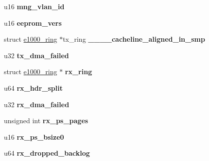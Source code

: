 \begin{DoxyCompactItemize}
\item 
\hypertarget{structe1000__adapter_ae96b179217d5f53721369aa524b6a6dc}{
u16 {\bfseries mng\_\-vlan\_\-id}}
\label{structe1000__adapter_ae96b179217d5f53721369aa524b6a6dc}

\item 
\hypertarget{structe1000__adapter_ab893f162d055d60c609dfdb01b1e618d}{
u16 {\bfseries eeprom\_\-vers}}
\label{structe1000__adapter_ab893f162d055d60c609dfdb01b1e618d}

\item 
\hypertarget{structe1000__adapter_a319f08ec5bbde8616b1a4cb3dfbb8e71}{
struct \hyperlink{structe1000__ring}{e1000\_\-ring} $\ast$tx\_\-ring {\bfseries \_\-\_\-\_\-\_\-cacheline\_\-aligned\_\-in\_\-smp}}
\label{structe1000__adapter_a319f08ec5bbde8616b1a4cb3dfbb8e71}

\item 
\hypertarget{structe1000__adapter_a5222b2538cdb1e7e297dbcc865d02fa0}{
u32 {\bfseries tx\_\-dma\_\-failed}}
\label{structe1000__adapter_a5222b2538cdb1e7e297dbcc865d02fa0}

\item 
\hypertarget{structe1000__adapter_ab75625703297f99997931eb20385b78c}{
struct \hyperlink{structe1000__ring}{e1000\_\-ring} $\ast$ {\bfseries rx\_\-ring}}
\label{structe1000__adapter_ab75625703297f99997931eb20385b78c}

\item 
\hypertarget{structe1000__adapter_af53abcb6dcc16b462851268aa6a08b57}{
u64 {\bfseries rx\_\-hdr\_\-split}}
\label{structe1000__adapter_af53abcb6dcc16b462851268aa6a08b57}

\item 
\hypertarget{structe1000__adapter_a25af109d30a90fe362212f5e22417174}{
u32 {\bfseries rx\_\-dma\_\-failed}}
\label{structe1000__adapter_a25af109d30a90fe362212f5e22417174}

\item 
\hypertarget{structe1000__adapter_a71f2b151d12e8d05d93fd7e4647db663}{
unsigned int {\bfseries rx\_\-ps\_\-pages}}
\label{structe1000__adapter_a71f2b151d12e8d05d93fd7e4647db663}

\item 
\hypertarget{structe1000__adapter_a77323ae502f70783c3032bbb70368ff4}{
u16 {\bfseries rx\_\-ps\_\-bsize0}}
\label{structe1000__adapter_a77323ae502f70783c3032bbb70368ff4}

\item 
\hypertarget{structe1000__adapter_a60d383415cda2a3022a790496a940e4d}{
u64 {\bfseries rx\_\-dropped\_\-backlog}}
\label{structe1000__adapter_a60d383415cda2a3022a790496a940e4d}


\end{DoxyCompactItemize}
